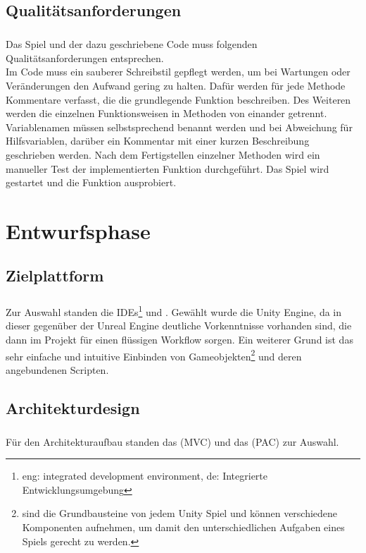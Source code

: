 \section{Qualitätsanforderungen}
\paragraph{}
Das Spiel und der dazu geschriebene Code muss folgenden Qualitätsanforderungen entsprechen. \\
Im Code muss ein sauberer Schreibstil gepflegt werden, um bei Wartungen oder Veränderungen den Aufwand gering zu halten. Dafür werden für jede Methode Kommentare verfasst, die die grundlegende Funktion beschreiben. Des Weiteren werden die einzelnen Funktionsweisen in Methoden von einander getrennt. Variablenamen müssen selbstsprechend benannt werden und bei Abweichung für Hilfsvariablen, darüber ein Kommentar mit einer kurzen Beschreibung geschrieben werden.
Nach dem Fertigstellen einzelner Methoden wird ein manueller Test der implementierten Funktion durchgeführt. Das Spiel wird gestartet und die Funktion ausprobiert.

\chapter{Entwurfsphase}
\section{Zielplattform}
\paragraph{}
Zur Auswahl standen die IDEs\footnote{eng: integrated development environment, de: Integrierte Entwicklungsumgebung}  und . Gewählt wurde die Unity Engine, da in dieser gegenüber der Unreal Engine deutliche Vorkenntnisse vorhanden sind, die dann im Projekt für einen flüssigen Workflow sorgen. Ein weiterer Grund ist das sehr einfache und intuitive Einbinden von Gameobjekten\footnote{ sind die Grundbausteine von jedem Unity Spiel und können verschiedene Komponenten aufnehmen, um damit den unterschiedlichen Aufgaben eines Spiels gerecht zu werden.} und deren angebundenen Scripten.

\section{Architekturdesign}
\paragraph{}
Für den Architekturaufbau standen das  (MVC) und das  (PAC) zur Auswahl.
